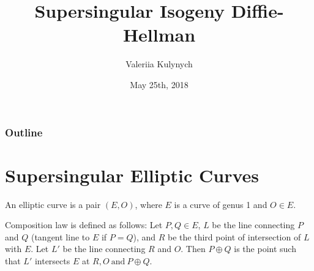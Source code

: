 \documentclass{beamer}
\title{Supersingular Isogeny Diffie-Hellman}
\author{Valeriia Kulynych}
\institute{Université de Toulon}
\date{May 25th, 2018}
\begin{document}
\begin{frame}
	\titlepage
\end{frame}

\begin{frame}
	\frametitle{Outline}
	\tableofcontents
\end{frame}

\section{Supersingular Elliptic Curves}

\begin{frame}
	\begin{definition}
		An \alert{elliptic curve} is a pair $(E, O)$, where $E$ is a curve of genus 1 and $O \in E$.
	\end{definition}
	
	Composition law is defined as follows:
		Let $P, Q \in E$, $L$ be the line connecting $P$ and $Q$ (tangent line to $E$ if $P = Q$), and $R$ be the third point of intersection of $L$ with $E$. Let $L'$ be the line connecting $R$ and $O$. Then $P \oplus Q$ is the point such that $L'$ intersects $E$ at $R, O \ \text{and} \ P \oplus Q$.

\end{frame}
\end{document}
